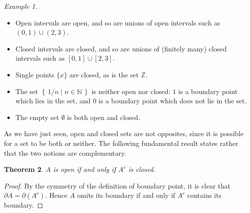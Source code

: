 \documentclass[11pt,oneside]{amsbook}
\newcommand{\set}[1]{\left\{\,#1\,\right\}}
\newcommand{\N}{\mathbb N}
\newcommand{\Z}{\mathbb Z}
\theoremstyle{definition}
\theoremstyle{plain}
\newtheorem{theorem}{Theorem}[section]
\theoremstyle{definition}
\theoremstyle{remark}
\newtheorem{example}[theorem]{Example}
\numberwithin{equation}{section}
\numberwithin{figure}{section}
\begin{document}
\begin{example}
  \begin{itemize}
  \item Open intervals are open, and so are unions of open intervals such as $(0,1)\cup(2,3)$.
  \item Closed intervals are closed, and so are unions of (finitely many) closed intervals such as $[0,1]\cup[2,3]$.
  \item Single points $\{x\}$ are closed, as is the set $\Z$.
  \item The set $\set{1/n\mid n\in\N}$ is neither open nor closed: $1$ is a boundary point which lies in the set, and $0$ is a boundary point which does not lie in the set.
  \item The empty set $\emptyset$ is both open and closed.
  \end{itemize}
\end{example}

As we have just seen, open and closed sets are not opposites, since it is possible for a set to be both or neither. The following fundamental result states rather that the two notions are complementary.

\begin{theorem}
  $A$ is open if and only if $A^c$ is closed.
\end{theorem}

\begin{proof}
  By the symmetry of the definition of boundary point, it is clear that $\partial A=\partial(A^c)$. Hence $A$ omits its boundary if and only if $A^c$ contains its boundary.
\end{proof}
\end{document}
